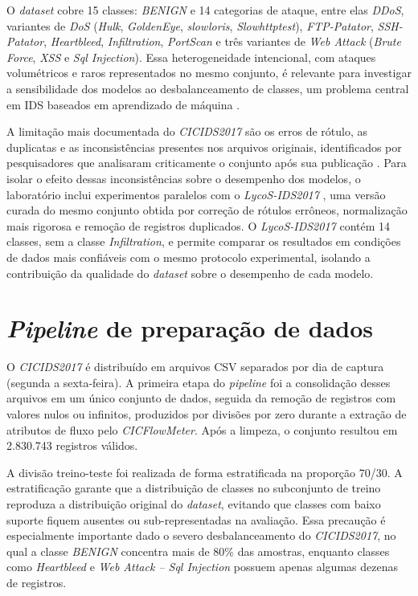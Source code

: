 O \textit{dataset} cobre 15 classes: \textit{BENIGN} e 14 categorias de ataque, entre elas \textit{DDoS}, variantes de \textit{DoS} (\textit{Hulk}, \textit{GoldenEye}, \textit{slowloris}, \textit{Slowhttptest}), \textit{FTP-Patator}, \textit{SSH-Patator}, \textit{Heartbleed}, \textit{Infiltration}, \textit{PortScan} e três variantes de \textit{Web Attack} (\textit{Brute Force}, \textit{XSS} e \textit{Sql Injection}). Essa heterogeneidade intencional, com ataques volumétricos e raros representados no mesmo conjunto, é relevante para investigar a sensibilidade dos modelos ao desbalanceamento de classes, um problema central em IDS baseados em aprendizado de máquina \cite{cantone2024}.

A limitação mais documentada do \textit{CICIDS2017} são os erros de rótulo, as duplicatas e as inconsistências presentes nos arquivos originais, identificados por pesquisadores que analisaram criticamente o conjunto após sua publicação \cite{engelen2021}. Para isolar o efeito dessas inconsistências sobre o desempenho dos modelos, o laboratório inclui experimentos paralelos com o \textit{LycoS-IDS2017} \cite{engelen2021}, uma versão curada do mesmo conjunto obtida por correção de rótulos errôneos, normalização mais rigorosa e remoção de registros duplicados. O \textit{LycoS-IDS2017} contém 14 classes, sem a classe \textit{Infiltration}, e permite comparar os resultados em condições de dados mais confiáveis com o mesmo protocolo experimental, isolando a contribuição da qualidade do \textit{dataset} sobre o desempenho de cada modelo.

\section{\textit{Pipeline} de preparação de dados}

O \textit{CICIDS2017} é distribuído em arquivos CSV separados por dia de captura (segunda a sexta-feira). A primeira etapa do \textit{pipeline} foi a consolidação desses arquivos em um único conjunto de dados, seguida da remoção de registros com valores nulos ou infinitos, produzidos por divisões por zero durante a extração de atributos de fluxo pelo \textit{CICFlowMeter}. Após a limpeza, o conjunto resultou em 2.830.743 registros válidos.

A divisão treino-teste foi realizada de forma estratificada na proporção 70/30. A estratificação garante que a distribuição de classes no subconjunto de treino reproduza a distribuição original do \textit{dataset}, evitando que classes com baixo suporte fiquem ausentes ou sub-representadas na avaliação. Essa precaução é especialmente importante dado o severo desbalanceamento do \textit{CICIDS2017}, no qual a classe \textit{BENIGN} concentra mais de 80\% das amostras, enquanto classes como \textit{Heartbleed} e \textit{Web Attack -- Sql Injection} possuem apenas algumas dezenas de registros.

